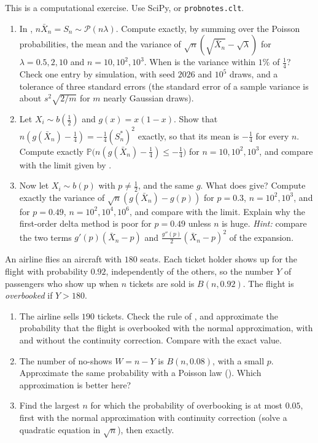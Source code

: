 \begin{exercise}\label{ex:ct-delta-numerics}
\medium This is a computational exercise. Use SciPy, or \texttt{probnotes.clt}.
\begin{enumerate}[label=(\alph*)]
  \item In , $n\bar X_n=S_n\sim\mathcal P(n\lambda)$. Compute
    exactly, by summing over the Poisson probabilities, the mean and the variance of
    $\sqrt n(\sqrt{\bar X_n}-\sqrt\lambda)$ for $\lambda=0.5,2,10$ and $n=10,10^2,10^3$. When is
    the variance within $1\%$ of $\frac14$? Check one entry by simulation, with seed $2026$ and
    $10^5$ draws, and a tolerance of three standard errors (the standard error of a sample variance
    is about $s^2\sqrt{2/m}$ for $m$ nearly Gaussian draws).
  \item Let $X_i\sim b(\frac12)$ and $g(x)=x(1-x)$. Show that
    $n(g(\bar X_n)-\frac14)=-\frac14(S_n^*)^2$ exactly, so that its mean is $-\frac14$ for every
    $n$. Compute exactly $\mathbb P\big(n(g(\bar X_n)-\frac14)\le-\frac14\big)$ for $n=10,10^2,10^3$,
    and compare with the limit given by .
  \item Now let $X_i\sim b(p)$ with $p\ne\frac12$, and the same $g$. What does
     give? Compute exactly the variance of $\sqrt n(g(\bar X_n)-g(p))$ for
    $p=0.3$, $n=10^2,10^3$, and for $p=0.49$, $n=10^2,10^4,10^6$, and compare with the limit. Explain
    why the first-order delta method is poor for $p=0.49$ unless $n$ is huge. \emph{Hint:} compare
    the two terms $g'(p)(\bar X_n-p)$ and $\frac{g''(p)}2(\bar X_n-p)^2$ of the expansion.
\end{enumerate}
\end{exercise}

\begin{exercise}\label{ex:ct-overbooking}
\medium An airline flies an aircraft with $180$ seats. Each ticket holder shows up for the flight
with probability $0.92$, independently of the others, so the number $Y$ of passengers who show up
when $n$ tickets are sold is $B(n,0.92)$. The flight is \emph{overbooked} if $Y>180$.
\begin{enumerate}[label=(\alph*)]
  \item The airline sells $190$ tickets. Check the rule of , and
    approximate the probability that the flight is overbooked with the normal approximation, with
    and without the continuity correction. Compare with the exact value.
  \item The number of no-shows $W=n-Y$ is $B(n,0.08)$, with a small $p$. Approximate the same
    probability with a Poisson law (). Which approximation is better
    here?
  \item Find the largest $n$ for which the probability of overbooking is at most $0.05$, first with the
    normal approximation with continuity correction (solve a quadratic equation in $\sqrt n$), then
    exactly.
\end{enumerate}
\end{exercise}

